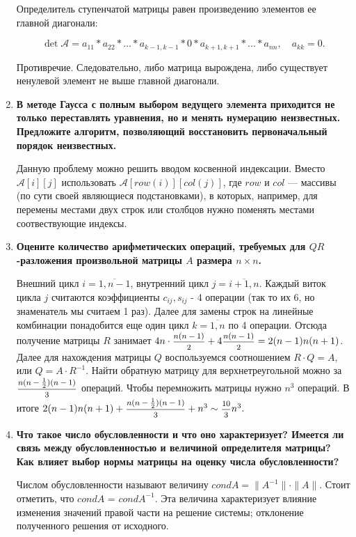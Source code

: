 \documentclass[12pt, a4paper]{article}
\begin{document}
\begin{enumerate}
Определитель ступенчатой матрицы равен произведению элементов ее главной диагонали:

\[
\det \mathcal{A} = a_{11} * a_{22} * ... * a_{k-1, k-1} * 0 * a_{k+1, k+1} * ... * a_{nn}, \quad a_{kk} = 0.
\]

Противречие. Следовательно, либо матрица вырождена, либо существует ненулевой элемент не выше главной диагонали. 

\pagebreak

\item{\bf В методе Гаусса с полным выбором ведущего элемента
приходится не только переставлять уравнения, но и менять нумерацию неизвестных. Предложите алгоритм, позволяющий восстановить первоначальный порядок неизвестных.}

Данную проблему можно решить вводом косвенной индексации. Вместо $\mathcal{A}[i][j]$ использовать $\mathcal{A}[row(i)][col(j)]$, где $row$ и $col$ --- массивы (по сути своей являющиеся подстановками), в которых, например, для перемены местами двух строк или столбцов нужно поменять местами соотвествующие индексы.

\item{\bf Оцените количество арифметических операций, требуемых для 	$QR$-разложения произвольной матрицы $A$ размера $n \times n$.}

Внешний цикл $i = \overline{1 , n-1}$, внутренний цикл $j = \overline{i+1,n}$. Каждый виток цикла $j$ считаются коэффициенты $c_{ij}, s_{ij}$ - 4 операции (так то их 6, но знаменатель мы считаем 1 раз). Далее для замены строк на линейные комбинации понадобится еще один цикл $k =\overline{1,n}$ по 4 операции. Отсюда получение матрицы $R$ занимает $4n\cdot \hbox{\footnotesize$\displaystyle\frac{n(n-1)}{2}$} + 4\hbox{\footnotesize$\displaystyle\frac{n(n-1)}{2}$} = 2(n-1)n(n+1)$. Далее для нахождения матрицы $Q$ воспользуемся соотношением $R\cdot Q = A$, или $Q = A\cdot R^{-1}$. Найти обратную матрицу для верхнетреугольной можно за $\hbox{\footnotesize$\displaystyle\frac{n(n-\frac{1}{2})(n-1)}{3}$}$ операций. Чтобы перемножить матрицы нужно $n^3$ операций. В итоге $2(n-1)n(n+1)+\hbox{\footnotesize$\displaystyle\frac{n(n-\frac{1}{2})(n-1)}{3}$} + n^3\sim \hbox{\footnotesize$\displaystyle\frac{10}{3}$}n^3.$

\item{\bf Что такое число обусловленности и что оно характеризует? Имеется ли связь между обусловленностью и величиной определителя матрицы? Как влияет выбор нормы матрицы на оценку числа обусловленности?}

Числом обусловленности называют величину $ cond{A} = \| A^{-1} \| \cdot \| A \| .$ Стоит отметить, что $ cond{A} $ = $ cond{A^{-1}} .$ Эта величина характеризует влияние изменения значений правой части на решение системы; отклонение полученного решения от исходного.


\end{enumerate}
\end{document}
